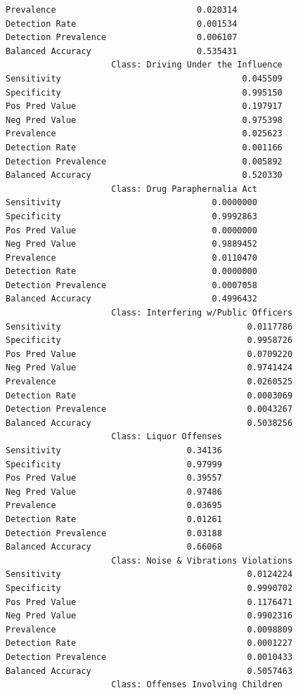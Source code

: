 \documentclass[
  article]{jss}
\begin{document}
\begin{verbatim}
Prevalence                            0.020314
Detection Rate                        0.001534
Detection Prevalence                  0.006107
Balanced Accuracy                     0.535431
                     Class: Driving Under the Influence
Sensitivity                                    0.045509
Specificity                                    0.995150
Pos Pred Value                                 0.197917
Neg Pred Value                                 0.975398
Prevalence                                     0.025623
Detection Rate                                 0.001166
Detection Prevalence                           0.005892
Balanced Accuracy                              0.520330
                     Class: Drug Paraphernalia Act
Sensitivity                              0.0000000
Specificity                              0.9992863
Pos Pred Value                           0.0000000
Neg Pred Value                           0.9889452
Prevalence                               0.0110470
Detection Rate                           0.0000000
Detection Prevalence                     0.0007058
Balanced Accuracy                        0.4996432
                     Class: Interfering w/Public Officers
Sensitivity                                     0.0117786
Specificity                                     0.9958726
Pos Pred Value                                  0.0709220
Neg Pred Value                                  0.9741424
Prevalence                                      0.0260525
Detection Rate                                  0.0003069
Detection Prevalence                            0.0043267
Balanced Accuracy                               0.5038256
                     Class: Liquor Offenses
Sensitivity                         0.34136
Specificity                         0.97999
Pos Pred Value                      0.39557
Neg Pred Value                      0.97486
Prevalence                          0.03695
Detection Rate                      0.01261
Detection Prevalence                0.03188
Balanced Accuracy                   0.66068
                     Class: Noise & Vibrations Violations
Sensitivity                                     0.0124224
Specificity                                     0.9990702
Pos Pred Value                                  0.1176471
Neg Pred Value                                  0.9902316
Prevalence                                      0.0098809
Detection Rate                                  0.0001227
Detection Prevalence                            0.0010433
Balanced Accuracy                               0.5057463
                     Class: Offenses Involving Children

\end{verbatim}
\end{document}
